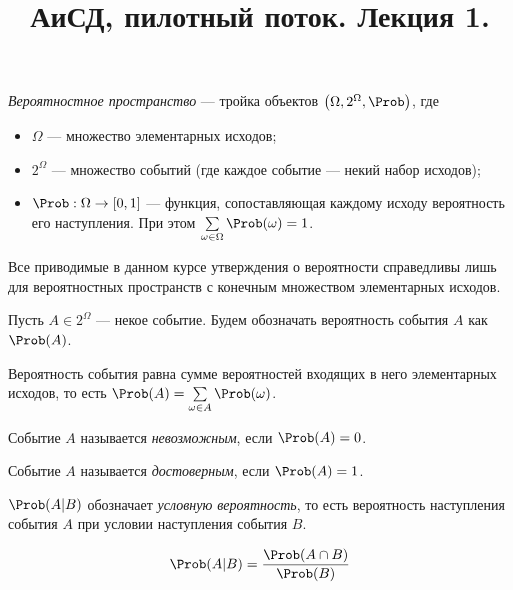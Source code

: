 \documentclass[a4paper, 12pt]{article}
\title{АиСД, пилотный поток. Лекция 1.}
\author{}
\date{}
\begin{document}
    \maketitle

    \begin{definition}
        \textit{Вероятностное пространство} --- тройка объектов \( \left( \Omega, 2^\Omega, \Prob \right) \), где
        \begin{itemize}
            \item \( \Omega \) --- множество элементарных исходов;
            \item \( 2^\Omega \) --- множество событий (где каждое событие --- некий набор исходов);
            \item \( \Prob : \Omega \to [0, 1] \) --- функция, сопоставляющая каждому исходу вероятность его наступления. При этом \(\sum\limits_{\omega \in \Omega} \Prob(\omega) = 1\).
        \end{itemize}
    \end{definition}

    \begin{remark}
        Все приводимые в данном курсе утверждения о вероятности справедливы лишь для вероятностных пространств с конечным множеством элементарных исходов.
    \end{remark}

    Пусть \( A \in 2^\Omega \) --- некое событие. Будем обозначать вероятность события \( A \) как \( \Prob(A) \).

    Вероятность события равна сумме вероятностей входящих в него элементарных исходов, то есть \( \Prob(A) = \sum\limits_{\omega \in A} \Prob(\omega) \).

    \begin{definition}
        Событие \( A \) называется \textit{невозможным}, если \( \Prob(A) = 0 \).
    \end{definition}

    \begin{definition}
        Событие \( A \) называется \textit{достоверным}, если \( \Prob(A) = 1 \).
    \end{definition}

    \begin{definition}
        \( \Prob(A | B) \) обозначает \textit{условную вероятность}, то есть вероятность наступления события \( A \) при условии наступления события \( B \).
    \end{definition}

    \[ \Prob(A | B) = \frac{\Prob(A \cap B)}{\Prob(B)} \]
\end{document}
